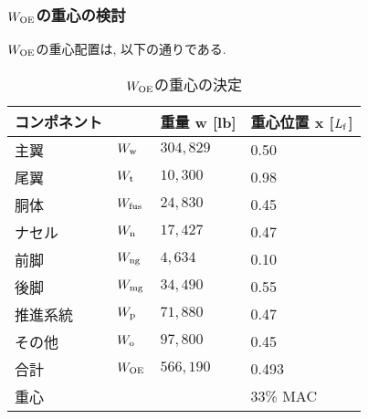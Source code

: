 \documentclass[12pt]{jsarticle}
\begin{document}
\subsubsection{$W_{\rm OE}$の重心の検討}
$W_{\rm OE}$の重心配置は, 以下の通りである.
\begin{table}[H]
	\caption{$W_{\rm OE}$の重心の決定}
	\begin{center}
		\begin{tabular}{p{2cm} p{2cm} p{3cm} p{3cm}} \hline
			コンポネント  & & 重量 w [lb] & 重心位置 x [$L_{\rm f}$] \\ \hline \hline
			主翼 & $W_{\rm w}$ & $304,829$ & 0.50 \\
			尾翼 & $W_{\rm t}$ & $10,300$ & 0.98 \\
			胴体 & $W_{\rm fus}$ & $24,830$ & 0.45 \\
			ナセル & $W_{\rm n}$ & $17,427$ & 0.47 \\
			前脚 & $W_{\rm ng}$ & $4,634$ & 0.10 \\
			後脚 & $W_{\rm mg}$ & $34,490$ & 0.55 \\
			推進系統 & $W_{\rm p}$ & $71,880$ & 0.47 \\
			その他 & $W_{\rm o}$ & $97,800$ & 0.45 \\ \hline
			合計 & $W_{\rm OE}$ & $566,190$ & 0.493 \\ \hline \hline
			重心 & & & 33\% MAC \\ \hline
		\end{tabular}
	\end{center}
\end{table}
\end{document}
